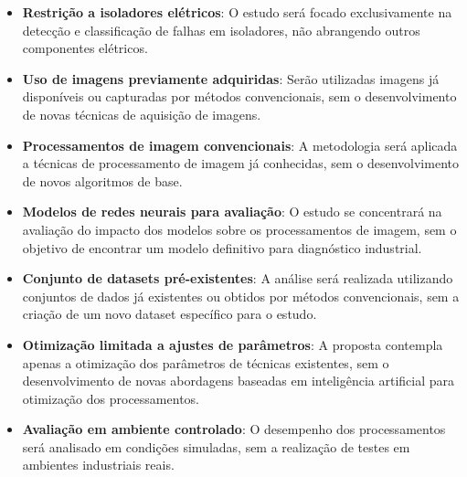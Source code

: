 \documentclass[12pt]{article}
\begin{document}
\begin{itemize}
    \item \textbf{Restrição a isoladores elétricos}: O estudo será focado exclusivamente na detecção e classificação de falhas em isoladores, não abrangendo outros componentes elétricos.
    \item \textbf{Uso de imagens previamente adquiridas}: Serão utilizadas imagens já disponíveis ou capturadas por métodos convencionais, sem o desenvolvimento de novas técnicas de aquisição de imagens.
    \item \textbf{Processamentos de imagem convencionais}: A metodologia será aplicada a técnicas de processamento de imagem já conhecidas, sem o desenvolvimento de novos algoritmos de base.
    \item \textbf{Modelos de redes neurais para avaliação}: O estudo se concentrará na avaliação do impacto dos modelos sobre os processamentos de imagem, sem o objetivo de encontrar um modelo definitivo para diagnóstico industrial.
    \item \textbf{Conjunto de datasets pré-existentes}: A análise será realizada utilizando conjuntos de dados já existentes ou obtidos por métodos convencionais, sem a criação de um novo dataset específico para o estudo.
    \item \textbf{Otimização limitada a ajustes de parâmetros}: A proposta contempla apenas a otimização dos parâmetros de técnicas existentes, sem o desenvolvimento de novas abordagens baseadas em inteligência artificial para otimização dos processamentos.
    \item \textbf{Avaliação em ambiente controlado}: O desempenho dos processamentos será analisado em condições simuladas, sem a realização de testes em ambientes industriais reais.
\end{itemize}
\end{document}
